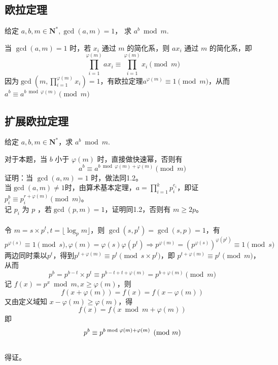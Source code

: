 \documentclass[12pt,a4paper]{article}
\begin{document}
\subsection{欧拉定理}
\begin{mdframed}[leftline=true, linewidth=2pt, linecolor=gray]
	给定 $a,b,m\in \mathbf{N^*},\gcd(a,m)=1$， 求 $a^b\bmod{m}$.
\end{mdframed}
当 $\gcd(a,m)=1$ 时，若 $x_i$ 通过 $m$ 的简化系，则 $ax_i$ 通过 $m$ 的简化系，即\begin{equation*}
	\displaystyle\prod^{\varphi(m)}_{i=1}ax_i\equiv\prod^{\varphi(m)}_{i=1}x_i\pmod{m}
\end{equation*}
因为$\displaystyle\gcd(m,\prod^{\varphi(m)}_{i=1}x_i)=1$，有欧拉定理$a^{\varphi(m)}\equiv1\pmod{m}$，从而 $a^b\equiv a^{b\bmod{\varphi(m)}}\pmod{m}$
\subsection{扩展欧拉定理}
\begin{mdframed}[leftline=true, linewidth=2pt, linecolor=gray]
	给定 $a,b,m\in \mathbf{N^*}$，求 $a^b\bmod{m}$.
\end{mdframed}
对于本题，当 $b$ 小于 $\varphi(m)$ 时，直接做快速幂，否则有
\begin{equation*}
	\displaystyle a^b\equiv a^{b\bmod{\varphi(m)}+\varphi(m)}\pmod{m}
\end{equation*}
证明：当 $\gcd(a,m)=1$ 时，做法同1.2。\\
当$\gcd(a,m)\neq1$时，由算术基本定理，$\displaystyle a=\prod_{i=1}^{k}p_i^{e_i}$，即证 $p_i^b\equiv p_i^{r+\varphi(m)}\pmod{m}$。\\记 $p_i$ 为 $p$ ，若$\gcd(p,m)=1$，证明同1.2，否则有 $m\ge 2p$。\\\\
令 $m=s\times p^t,t=\lfloor\log_p{m}\rfloor$，则 $\gcd(s,p^t)=\gcd(s,p)=1$，有
\begin{equation*}
	p^{\varphi(s)}\equiv1\pmod{s},\varphi(m)=\varphi(s)\varphi(p^t)\Rightarrow p^{\varphi(m)}=(p^{\varphi(s)})^{\varphi(p^t)}\equiv1\pmod{s}
\end{equation*}
两边同时乘以$p^t$，得到$p^{t+\varphi(m)}\equiv p^t\pmod{s\times p^t}$，即 $p^{t+\varphi(m)}\equiv p^t\pmod{m}$，从而
\begin{equation*}
	\displaystyle p^b=p^{b-t}\times p^t\equiv p^{b-t+t+\varphi(m)}=p^{b+\varphi(m)}\pmod{m}
\end{equation*}
记 $f(x)=p^{x}\bmod{m},x\ge\varphi(m)$，则 \begin{equation*}
	f(x+\varphi(m))=f(x)=f(x-\varphi(m))
\end{equation*}
又由定义域知 $x-\varphi(m)\ge\varphi(m)$，得 
\begin{equation*}
	f(x)=f(x\bmod{m}+\varphi(m))
\end{equation*}
即
\begin{equation*}
	p^b\equiv p^{b\bmod{\varphi(m)}+\varphi(m)}\pmod{m}\\
\end{equation*} 
\\得证。
\end{document}
